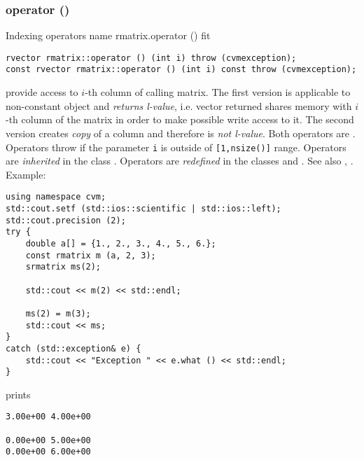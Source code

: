 \subsubsection{operator ()}
Indexing operators%
\pdfdest name {rmatrix.operator ()} fit
\begin{verbatim}
rvector rmatrix::operator () (int i) throw (cvmexception);
const rvector rmatrix::operator () (int i) const throw (cvmexception);
\end{verbatim}
provide access to  \hbox{$i$-th} column of calling matrix. The first version
is applicable to non-constant object and
\emph{returns  l-value}, i.e. vector returned shares  memory
with \hbox{$i$-th} column of the matrix
in order to make possible write access to it.
The second version creates  \emph{copy} of a column and therefore is
\emph{not l-value}.
Both operators are \Based.
Operators throw 
if the parameter \verb"i" is outside of \verb"[1,nsize()]" range.
Operators are \emph{inherited}
in  the class
.
Operators are \emph{redefined}
in  the classes 
and .
See also ,
.
Example:
\begin{Verbatim}
using namespace cvm;
std::cout.setf (std::ios::scientific | std::ios::left);
std::cout.precision (2);
try {
    double a[] = {1., 2., 3., 4., 5., 6.};
    const rmatrix m (a, 2, 3);
    srmatrix ms(2);

    std::cout << m(2) << std::endl;

    ms(2) = m(3);
    std::cout << ms;
}
catch (std::exception& e) {
    std::cout << "Exception " << e.what () << std::endl;
}
\end{Verbatim}
prints
\begin{Verbatim}
3.00e+00 4.00e+00

0.00e+00 5.00e+00
0.00e+00 6.00e+00
\end{Verbatim}
\newpage


